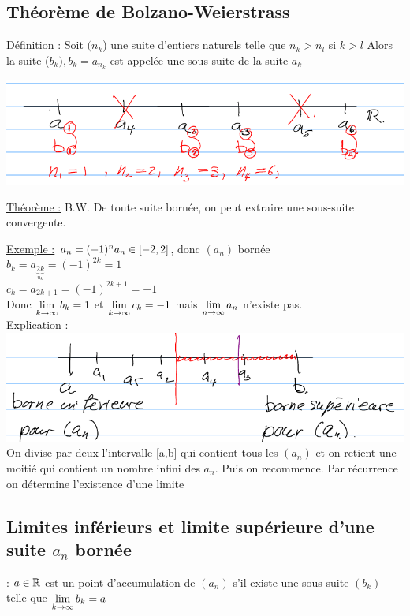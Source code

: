 \documentclass[12pt,a4paper]{article}
\begin{document}
{\subsection{Théorème de Bolzano-Weierstrass}
\begin{boite}
\underline{Définition :} Soit $(n_k$) une suite d'entiers naturels telle que $n_k > n_l$ si $k > l$ Alors la suite ($b_k), b_k = a_{n_k}$ est appelée une sous-suite de la suite $a_k$
\end{boite}
\includegraphics[scale=0.75]{illustrations_Analyse/b_w}
\begin{boite}
\underline{Théorème :} B.W. De toute suite bornée, on peut extraire une sous-suite convergente.
\end{boite}
\underline{Exemple :} $a_n = (-1)^n\\
a_n \in [-2,2]$, donc $(a_n)$ bornée\\
$b_k = a_{\underbrace{2k}_{n_k}} = (-1)^{2k} = 1$\\
$c_k = a_{2k+1} =(-1)^{2k+1} = -1$\\
Donc $\lim\limits_{k \to \infty} b_k = 1$ et $\lim\limits_{k\to \infty} c_k = -1$ mais $\lim\limits_{n \to \infty} a_n$ n'existe pas.\\
\underline{Explication :}\\
\includegraphics[scale=0.5]{illustrations_Analyse/expli}\\
On divise par deux l'intervalle [a,b] qui contient tous les $(a_n)$ et on retient une moitié qui contient un nombre infini des $a_n$. Puis on recommence. Par récurrence on détermine l'existence d'une limite
\subsection{Limites inférieurs et limite supérieure d'une suite $a_n$ bornée}
\begin{boite}
\Definition : $a\in \mathbb{R}$ est un point d'accumulation de $(a_n)$ s'il existe une sous-suite $(b_k)$ telle que $\lim\limits_{k \to \infty} b_k =a$
\end{boite}

}
\end{document}
